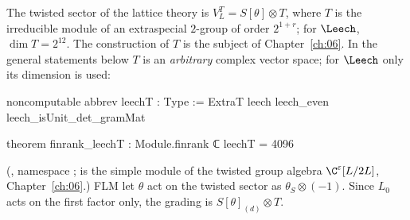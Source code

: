The twisted sector of the lattice theory is $V_L^T = S[\theta]\otimes T$, where $T$ is the irreducible
module of an extraspecial $2$-group of order $2^{1+r}$; for $\Leech$, $\dim T = 2^{12}$. The
construction of $T$ is the subject of Chapter~\ref{ch:06}. In the general statements below $T$ is an
\emph{arbitrary} complex vector space; for $\Leech$ only its dimension is used:
\begin{leancode}
noncomputable abbrev leechT : Type := ExtraT leech leech_even leech_isUnit_det_gramMat

theorem finrank_leechT : Module.finrank ℂ leechT = 4096
\end{leancode}
(, namespace ; 
is the simple module of the twisted group algebra $\C^\varepsilon[L/2L]$, Chapter~\ref{ch:06}.)
FLM let $\theta$ act on the twisted sector as $\theta_S\otimes(-1)$. Since $L_0$ acts on the first
factor only, the grading is $S[\theta]_{(d)}\otimes T$.

